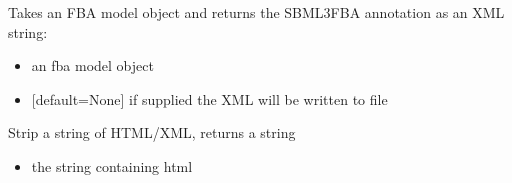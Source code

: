 \documentclass[letterpaper,10pt,english]{sphinxmanual}
\begin{document}

\begin{fulllineitems}
\label{\detokenize{modules_doc:cbmpy.CBXML.xml_getSBML2FBAannotation}}
\pysigstartsignatures
{}
\pysigstopsignatures
\sphinxAtStartPar
Takes an FBA model object and returns the SBML3FBA annotation as an XML string:
\begin{itemize}
\item {} 
\sphinxAtStartPar
{} an fba model object

\item {} 
\sphinxAtStartPar
{} {[}default=None{]} if supplied the XML will be written to file 

\end{itemize}

\end{fulllineitems}


\begin{fulllineitems}
\label{\detokenize{modules_doc:cbmpy.CBXML.xml_stripTags}}
\pysigstartsignatures
{}
\pysigstopsignatures
\sphinxAtStartPar
Strip a string of HTML/XML, returns a string
\begin{itemize}
\item {} 
\sphinxAtStartPar
{} the string containing html

\end{itemize}

\end{fulllineitems}

\end{document}
